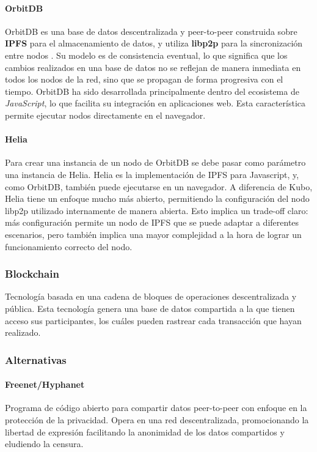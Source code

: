 \paragraph{OrbitDB}
OrbitDB es una base de datos descentralizada y peer-to-peer construida sobre \textbf{IPFS} para el almacenamiento de datos, y utiliza \textbf{libp2p} para la sincronización entre nodos \cite{orbitdb}. Su modelo es de consistencia eventual, lo que significa que los cambios realizados en una base de datos no se reflejan de manera inmediata en todos los nodos de la red, sino que se propagan de forma progresiva con el tiempo.
OrbitDB ha sido desarrollada principalmente dentro del ecosistema de \textit{JavaScript}, lo que facilita su integración en aplicaciones web. Esta característica permite ejecutar nodos directamente en el navegador.

\paragraph{Helia} Para crear una instancia de un nodo de OrbitDB se debe pasar como parámetro una instancia de Helia. Helia \cite{helia} es la implementación de IPFS para Javascript, y, como OrbitDB, también puede ejecutarse en un navegador. A diferencia de Kubo, Helia tiene un enfoque mucho más abierto, permitiendo la configuración del nodo libp2p utilizado internamente de manera abierta. Esto implica un trade-off claro: más configuración permite un nodo de IPFS que se puede adaptar a diferentes escenarios, pero también implica una mayor complejidad a la hora de lograr un funcionamiento correcto del nodo.

\subsubsection{Blockchain}
Tecnología basada en una cadena de bloques de operaciones descentralizada y pública.  Esta tecnología genera una base de datos compartida a la que tienen acceso sus participantes, los cuáles pueden rastrear cada transacción que hayan realizado.\parencite{blockchain}




\subsubsection{Alternativas}
\paragraph{Freenet/Hyphanet}
Programa de código abierto para compartir datos peer-to-peer con enfoque en la protección de la privacidad. Opera en una red descentralizada, promocionando la libertad de expresión facilitando la anonimidad de los datos compartidos y eludiendo la censura.\cite{freenet}\cite{hyphanet}
